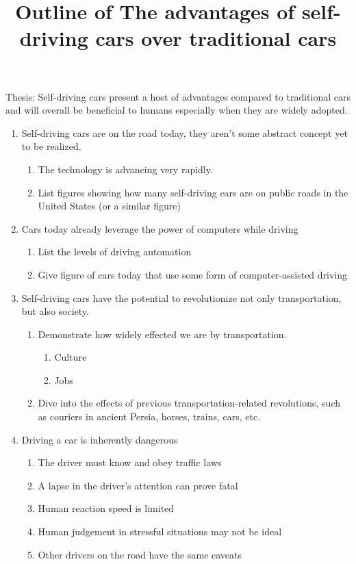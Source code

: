 \documentclass{mla}
\title{Outline of The advantages of self-driving cars over traditional cars}
\begin{document}
\makeheader
Thesis: Self-driving cars present a host of advantages compared to traditional cars and will overall be beneficial to humans especially when they are widely adopted.

\begin{enumerate}
	\item Self-driving cars are on the road today, they aren't some abstract concept yet to be realized.
	\begin{enumerate}
	    \item The technology is advancing very rapidly.
	    \item List figures showing how many self-driving cars are on public roads in the United States (or a similar figure)
	\end{enumerate}
	
	\item Cars today already leverage the power of computers while driving
	\begin{enumerate}
	    \item List the levels of driving automation
	    \item Give figure of cars today that use some form of computer-assisted driving
	\end{enumerate}
	
	\item Self-driving cars have the potential to revolutionize not only transportation, but also society.
	\begin{enumerate}
	    \item Demonstrate how widely effected we are by transportation.
	    \begin{enumerate}
	        \item Culture
	        \item Jobs
	    \end{enumerate}
	    \item Dive into the effects of previous transportation-related revolutions, such as couriers in ancient Persia, horses, trains, cars, etc.
	\end{enumerate}
	
	\item Driving a car is inherently dangerous
	\begin{enumerate}
	    \item The driver must know and obey traffic laws
	    \item A lapse in the driver's attention can prove fatal
	    \item Human reaction speed is limited
	    \item Human judgement in stressful situations may not be ideal
	    \item Other drivers on the road have the same caveats
	\end{enumerate}
	

\end{enumerate}
\end{document}
